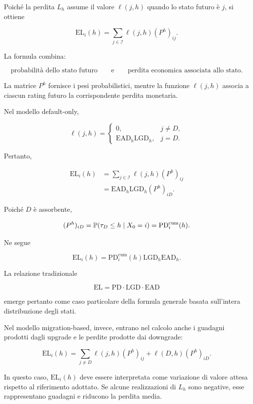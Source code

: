 Poich\'{e} la perdita $L_h$ assume il valore $\ell(j,h)$ quando
lo stato futuro \`{e} $j$, si ottiene

\[
\boxed{
\mathrm{EL}_i(h)
=
\sum_{j\in\mathcal{I}}
\ell(j,h)(P^h)_{ij}.
}
\]

La formula combina:

\[
\text{probabilit\`{a} dello stato futuro}
\qquad\text{e}\qquad
\text{perdita economica associata allo stato}.
\]

La matrice $P^h$ fornisce i pesi probabilistici, mentre la funzione
$\ell(j,h)$ associa a ciascun rating futuro la corrispondente perdita
monetaria.

Nel modello default-only,

\[
\ell(j,h)
=
\begin{cases}
0, & j\neq D,\\[1mm]
\mathrm{EAD}_h\mathrm{LGD}_h, & j=D.
\end{cases}
\]

Pertanto,

\[
\begin{split}
\mathrm{EL}_i(h)
&=
\sum_{j\in\mathcal{I}}
\ell(j,h)(P^h)_{ij}
\\
&=
\mathrm{EAD}_h\mathrm{LGD}_h(P^h)_{iD}.
\end{split}
\]

Poich\'{e} $D$ \`{e} assorbente,

\[
(P^h)_{iD}
=
\mathbb{P}(\tau_D\leq h\mid X_0=i)
=
\mathrm{PD}_{i}^{\mathrm{cum}}(h).
\]

Ne segue

\[
\mathrm{EL}_i(h)
=
\mathrm{PD}_{i}^{\mathrm{cum}}(h)
\mathrm{LGD}_h
\mathrm{EAD}_h.
\]

La relazione tradizionale

\[
\mathrm{EL}
=
\mathrm{PD}\cdot\mathrm{LGD}\cdot\mathrm{EAD}
\]

emerge pertanto come caso particolare della formula generale basata
sull'intera distribuzione degli stati.

Nel modello migration-based, invece, entrano nel calcolo anche i
guadagni prodotti dagli upgrade e le perdite prodotte dai downgrade:

\[
\mathrm{EL}_i(h)
=
\sum_{j\neq D}
\ell(j,h)(P^h)_{ij}
+
\ell(D,h)(P^h)_{iD}.
\]

In questo caso, $\mathrm{EL}_i(h)$ deve essere interpretata come
variazione di valore attesa rispetto al riferimento adottato. Se alcune
realizzazioni di $L_h$ sono negative, esse rappresentano guadagni e
riducono la perdita media.

